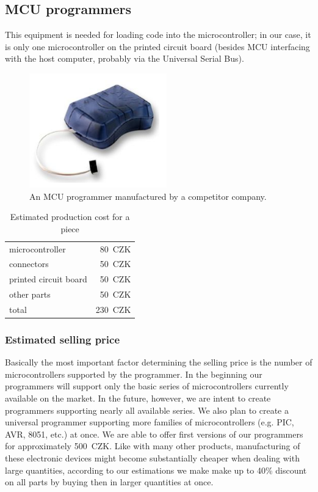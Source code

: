 \documentclass[a4paper,twoside,15pt]{book}
\begin{document}
        \subsection{MCU programmers}
            This equipment is needed for loading code into the microcontroller; in our case, it is only one microcontroller on the printed circuit board (besides MCU interfacing with the host computer, probably via the Universal Serial Bus).
            \begin{figure}[h!]
                \centering{}
                \includegraphics[width=.2\textwidth]{images/programmer.png}
                \caption{An MCU programmer manufactured by a competitor company.}
            \end{figure}

            \begin{table}[h!]
                \begin{tabular}{lr}
                    microcontroller         & 80~CZK        \\
                    connectors              & 50~CZK        \\
                    printed circuit board   & 50~CZK        \\
                    other parts             & 50~CZK        \\\hline
                    total                   & 230~CZK
                \end{tabular}
                \caption{Estimated production cost for a piece}
            \end{table}

            \subsubsection{Estimated selling price}
                Basically the most important factor determining the selling price is the number of microcontrollers supported by the programmer. In the beginning our programmers will support only the basic series of microcontrollers currently available on the market. In the future, however, we are intent to create programmers supporting nearly all available series. We also plan to create a universal programmer supporting more families of microcontrollers (e.g. PIC, AVR, 8051, etc.) at once. We are able to offer first versions of our programmers for approximately 500~CZK. Like with many other products, manufacturing of these electronic devices might become substantially cheaper when dealing with large quantities, according to our estimations we make make up to 40\% discount on all parts by buying then in larger quantities at once.
\end{document}
